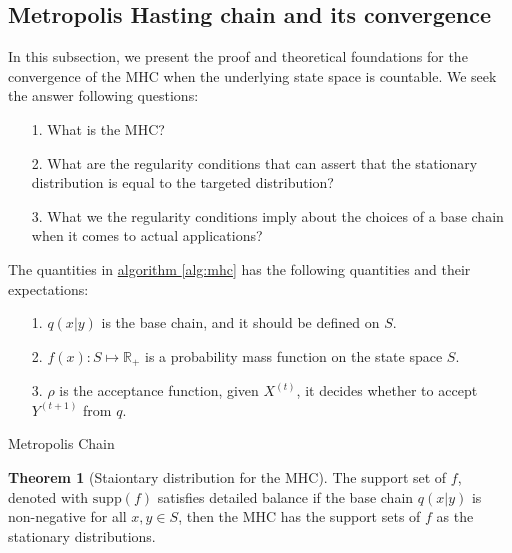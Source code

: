 \documentclass[]{article}
\theoremstyle{definition}
\newtheorem{theorem}{Theorem}       %
\begin{document}
    \subsection{Metropolis Hasting chain and its convergence}
        In this subsection, we present the proof and theoretical foundations for the convergence of the MHC when the underlying state space is countable. We seek the answer following questions: 
        \begin{itemize}
            \item [1.] What is the MHC? 
            \item [2.] What are the regularity conditions that can assert that the stationary distribution is equal to the targeted distribution? 
            \item [3.] What we the regularity conditions imply about the choices of a base chain when it comes to actual applications? 
        \end{itemize}
        The quantities in \hyperref[alg:mhc]{algorithm \ref*{alg:mhc}} has the following quantities and their expectations: 
        \begin{itemize}
            \item [1.] $q(x|y)$ is the base chain, and it should be defined on $S$. 
            \item [2.] $f(x): S \mapsto \mathbb R_+$ is a probability mass function on the state space $S$.
            \item [3.] $\rho$ is the acceptance function, given $X^{(t)}$, it decides whether to accept $Y^{(t + 1)}$ from $q$. 
        \end{itemize}
        \begin{algorithm}
            \begin{algorithmic}[1]
            \end{algorithmic}
            \caption{Metropolis Chain}
            \label{alg:mhc}
        \end{algorithm}
    \begin{theorem}[Staiontary distribution for the MHC]
        The support set of $f$, denoted with $\text{supp}(f)$ satisfies detailed balance if the base chain $q(x|y)$ is non-negative for all $x, y\in S$, then the MHC has the support sets of $f$ as the stationary distributions. 
    \end{theorem}
\end{document}
